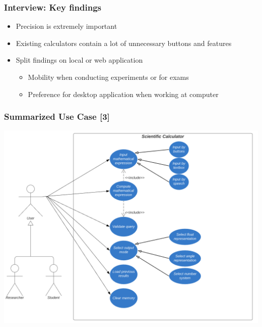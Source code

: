 \documentclass{beamer}
\begin{document}
\begin{frame}
\frametitle{Interview: Key findings}
\begin{itemize}
 \item Precision is extremely important
 \item Existing calculators contain a lot of unnecessary buttons and features
 \item Split findings on local or web application
  \begin{itemize}
   \item Mobility when conducting experiments or for exams
   \item Preference for desktop application when working at computer
  \end{itemize}
\end{itemize}
\end{frame}




\begin{frame}
\frametitle{Summarized Use Case [3]}
\includegraphics[scale=0.5]{Use Case}
\end{frame}
\end{document}
